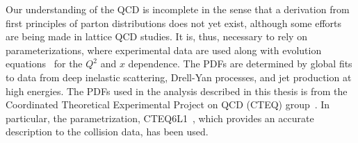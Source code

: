 Our understanding of the QCD is incomplete in the sense that a derivation from first principles of parton distributions does not yet exist, although 
some efforts are being made in lattice QCD studies. It is, thus, necessary to rely on parameterizations, where experimental data are used along with 
evolution equations~\cite{Altarelli:1977zs} for the $Q^{2}$ and $x$ dependence. The PDFs are determined by global fits to data from 
deep inelastic scattering, Drell-Yan processes, and jet production at high energies. The PDFs used in the analysis described in this 
thesis is from the Coordinated Theoretical Experimental Project on QCD (CTEQ) group~\cite{Nadolsky:2008zw}. In particular, the parametrization, 
CTEQ6L1~\cite{Pumplin:2002vw,Martin:2009iq}, which provides an accurate description to the collision data, has been used. 

